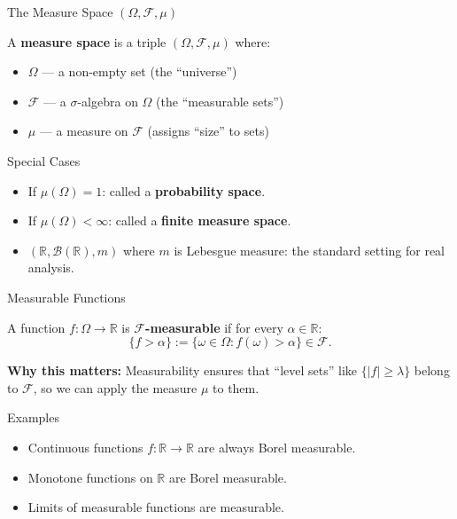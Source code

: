 \documentclass{beamer}
\begin{document}
\begin{frame}{The Measure Space $(\Omega, \mathscr{F}, \mu)$}
    \begin{definition}
        A \textbf{measure space} is a triple $(\Omega, \mathscr{F}, \mu)$ where:
        \begin{itemize}
            \item $\Omega$ — a non-empty set (the ``universe'')
            \item $\mathscr{F}$ — a $\sigma$-algebra on $\Omega$ (the ``measurable sets'')
            \item $\mu$ — a measure on $\mathscr{F}$ (assigns ``size'' to sets)
        \end{itemize}
    \end{definition}

    \vspace{0.3cm}
    \begin{block}{Special Cases}
        \begin{itemize}
            \item If $\mu(\Omega) = 1$: called a \textbf{probability space}.
            \item If $\mu(\Omega) < \infty$: called a \textbf{finite measure space}.
            \item $(\mathbb{R}, \mathcal{B}(\mathbb{R}), m)$ where $m$ is Lebesgue measure: the standard setting for real analysis.
        \end{itemize}
    \end{block}
\end{frame}

\begin{frame}{Measurable Functions}
    \begin{definition}
        A function $f: \Omega \to \mathbb{R}$ is \textbf{$\mathscr{F}$-measurable} if for every $\alpha \in \mathbb{R}$:
        \[
            \{f > \alpha\} := \{\omega \in \Omega : f(\omega) > \alpha\} \in \mathscr{F}.
        \]
    \end{definition}

    \vspace{0.3cm}
    \textbf{Why this matters:} Measurability ensures that ``level sets'' like $\{|f| \geq \lambda\}$ belong to $\mathscr{F}$, so we can apply the measure $\mu$ to them.

    \vspace{0.3cm}
    \begin{exampleblock}{Examples}
        \begin{itemize}
            \item Continuous functions $f: \mathbb{R} \to \mathbb{R}$ are always Borel measurable.
            \item Monotone functions on $\mathbb{R}$ are Borel measurable.
            \item Limits of measurable functions are measurable.
        \end{itemize}
    \end{exampleblock}
\end{frame}
\end{document}
